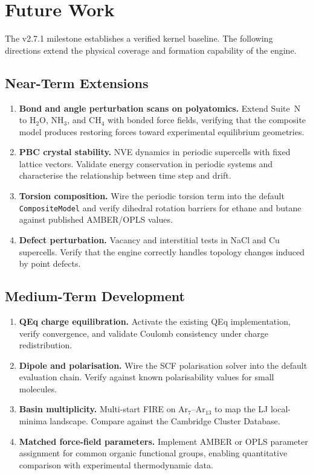 \documentclass[11pt,twoside]{article}
\newcommand{\type}[1]{\texttt{#1}}
\begin{document}
\section{Future Work}
\label{sec:future}

The v2.7.1 milestone establishes a verified kernel baseline. The following directions extend the physical coverage and formation capability of the engine.

\subsection{Near-Term Extensions}

\begin{enumerate}
  \item \textbf{Bond and angle perturbation scans on polyatomics.} Extend Suite~N to H$_2$O, NH$_3$, and CH$_4$ with bonded force fields, verifying that the composite model produces restoring forces toward experimental equilibrium geometries.

  \item \textbf{PBC crystal stability.} NVE dynamics in periodic supercells with fixed lattice vectors. Validate energy conservation in periodic systems and characterise the relationship between time step and drift.

  \item \textbf{Torsion composition.} Wire the periodic torsion term into the default \type{CompositeModel} and verify dihedral rotation barriers for ethane and butane against published AMBER/OPLS values.

  \item \textbf{Defect perturbation.} Vacancy and interstitial tests in NaCl and Cu supercells. Verify that the engine correctly handles topology changes induced by point defects.
\end{enumerate}

\subsection{Medium-Term Development}

\begin{enumerate}
  \item \textbf{QEq charge equilibration.} Activate the existing QEq implementation, verify convergence, and validate Coulomb consistency under charge redistribution.

  \item \textbf{Dipole and polarisation.} Wire the SCF polarisation solver into the default evaluation chain. Verify against known polarisability values for small molecules.

  \item \textbf{Basin multiplicity.} Multi-start FIRE on Ar$_7$--Ar$_{13}$ to map the LJ local-minima landscape. Compare against the Cambridge Cluster Database.

  \item \textbf{Matched force-field parameters.} Implement AMBER or OPLS parameter assignment for common organic functional groups, enabling quantitative comparison with experimental thermodynamic data.
\end{enumerate}
\end{document}
